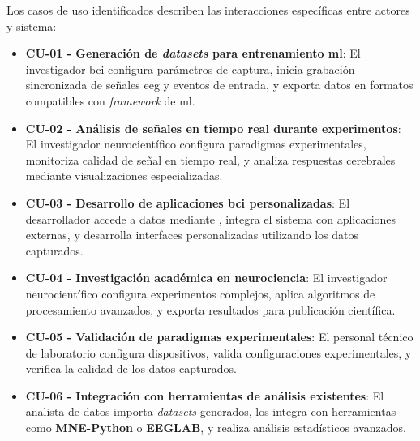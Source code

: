 Los casos de uso identificados describen las interacciones específicas entre actores y sistema:

\begin{itemize}
    \item \textbf{CU-01 - Generación de \textit{\glspl{dataset}} para entrenamiento \acrshort{ml}}: El investigador \acrshort{bci} configura parámetros de captura, inicia grabación sincronizada de señales \acrshort{eeg} y eventos de entrada, y exporta datos en formatos compatibles con \textit{\gls{framework}} de \acrshort{ml}.

    \item \textbf{CU-02 - Análisis de señales en tiempo real durante experimentos}: El investigador neurocientífico configura paradigmas experimentales, monitoriza calidad de señal en tiempo real, y analiza respuestas cerebrales mediante visualizaciones especializadas.

    \item \textbf{CU-03 - Desarrollo de aplicaciones \acrshort{bci} personalizadas}: El desarrollador accede a datos mediante , integra el sistema con aplicaciones externas, y desarrolla interfaces personalizadas utilizando los datos capturados.

    \item \textbf{CU-04 - Investigación académica en neurociencia}: El investigador neurocientífico configura experimentos complejos, aplica algoritmos de procesamiento avanzados, y exporta resultados para publicación científica.

    \item \textbf{CU-05 - Validación de paradigmas experimentales}: El personal técnico de laboratorio configura dispositivos, valida configuraciones experimentales, y verifica la calidad de los datos capturados.

    \item \textbf{CU-06 - Integración con herramientas de análisis existentes}: El analista de datos importa \textit{\glspl{dataset}} generados, los integra con herramientas como \textbf{MNE-Python} o \textbf{EEGLAB}, y realiza análisis estadísticos avanzados.
\end{itemize}









